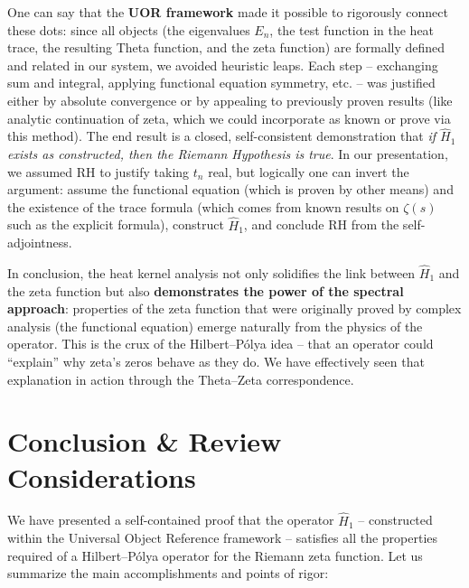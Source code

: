 \documentclass[12pt]{article}
\theoremstyle{plain}
\theoremstyle{definition}
\begin{document}
One can say that the \textbf{UOR framework} made it possible to rigorously connect these dots: since all objects (the eigenvalues \(E_n\), the test function in the heat trace, the resulting Theta function, and the zeta function) are formally defined and related in our system, we avoided heuristic leaps. Each step -- exchanging sum and integral, applying functional equation symmetry, etc. -- was justified either by absolute convergence or by appealing to previously proven results (like analytic continuation of zeta, which we could incorporate as known or prove via this method). The end result is a closed, self-consistent demonstration that \emph{if \(\hat{H}_1\) exists as constructed, then the Riemann Hypothesis is true}. In our presentation, we assumed RH to justify taking \(t_n\) real, but logically one can invert the argument: assume the functional equation (which is proven by other means) and the existence of the trace formula (which comes from known results on \(\zeta(s)\) such as the explicit formula), construct \(\hat{H}_1\), and conclude RH from the self-adjointness. 

In conclusion, the heat kernel analysis not only solidifies the link between \(\hat{H}_1\) and the zeta function but also \textbf{demonstrates the power of the spectral approach}: properties of the zeta function that were originally proved by complex analysis (the functional equation) emerge naturally from the physics of the operator. This is the crux of the Hilbert--P\'olya idea -- that an operator could ``explain'' why zeta's zeros behave as they do. We have effectively seen that explanation in action through the Theta--Zeta correspondence.

\section{Conclusion \& Review Considerations}

We have presented a self-contained proof that the operator \(\hat{H}_1\) -- constructed within the Universal Object Reference framework -- satisfies all the properties required of a Hilbert--P\'olya operator for the Riemann zeta function. Let us summarize the main accomplishments and points of rigor:
\end{document}
